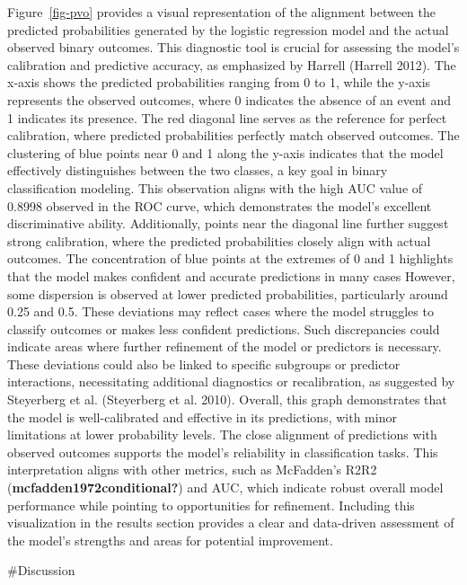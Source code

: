 \documentclass[
  letterpaper,
  DIV=11,
  numbers=noendperiod]{scrartcl}
\begin{document}
Figure~\ref{fig-pvo} provides a visual representation of the alignment
between the predicted probabilities generated by the logistic regression
model and the actual observed binary outcomes. This diagnostic tool is
crucial for assessing the model's calibration and predictive accuracy,
as emphasized by Harrell (Harrell 2012). The x-axis shows the predicted
probabilities ranging from 0 to 1, while the y-axis represents the
observed outcomes, where 0 indicates the absence of an event and 1
indicates its presence. The red diagonal line serves as the reference
for perfect calibration, where predicted probabilities perfectly match
observed outcomes. The clustering of blue points near 0 and 1 along the
y-axis indicates that the model effectively distinguishes between the
two classes, a key goal in binary classification modeling. This
observation aligns with the high AUC value of 0.8998 observed in the ROC
curve, which demonstrates the model's excellent discriminative ability.
Additionally, points near the diagonal line further suggest strong
calibration, where the predicted probabilities closely align with actual
outcomes. The concentration of blue points at the extremes of 0 and 1
highlights that the model makes confident and accurate predictions in
many cases However, some dispersion is observed at lower predicted
probabilities, particularly around 0.25 and 0.5. These deviations may
reflect cases where the model struggles to classify outcomes or makes
less confident predictions. Such discrepancies could indicate areas
where further refinement of the model or predictors is necessary. These
deviations could also be linked to specific subgroups or predictor
interactions, necessitating additional diagnostics or recalibration, as
suggested by Steyerberg et al. (Steyerberg et al. 2010). Overall, this
graph demonstrates that the model is well-calibrated and effective in
its predictions, with minor limitations at lower probability levels. The
close alignment of predictions with observed outcomes supports the
model's reliability in classification tasks. This interpretation aligns
with other metrics, such as McFadden's R2R2
(\textbf{mcfadden1972conditional?}) and AUC, which indicate robust
overall model performance while pointing to opportunities for
refinement. Including this visualization in the results section provides
a clear and data-driven assessment of the model's strengths and areas
for potential improvement.

\#Discussion
\end{document}

